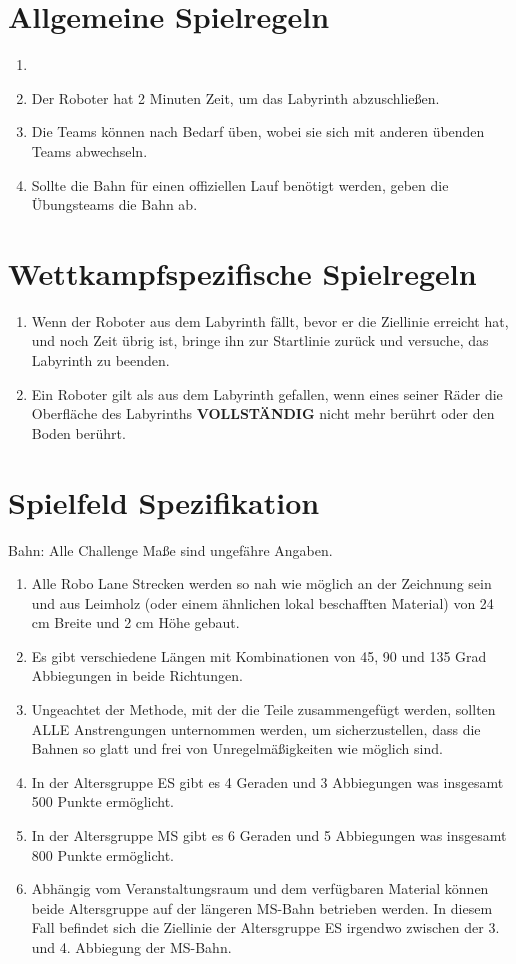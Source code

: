 \documentclass[a4paper,12pt]{article}
\begin{document}
\section{Allgemeine Spielregeln}
\begin{enumerate}
	\item \scoreRuns
	\item Der Roboter hat 2 Minuten Zeit, um das Labyrinth abzuschließen.
	\item Die Teams können nach Bedarf üben, wobei sie sich mit anderen
		übenden Teams abwechseln.
	\item Sollte die Bahn für einen offiziellen Lauf benötigt werden, geben
		die Übungsteams die Bahn ab.
\end{enumerate}

\section{Wettkampfspezifische Spielregeln}
\begin{enumerate}
	\item Wenn der Roboter aus dem Labyrinth fällt, bevor er die Ziellinie
		erreicht hat, und noch Zeit übrig ist, bringe ihn zur
		Startlinie zurück und versuche, das Labyrinth zu beenden.
	\item Ein Roboter gilt als aus dem Labyrinth gefallen, wenn eines
		seiner Räder die Oberfläche des Labyrinths \textbf{VOLLSTÄNDIG}
		nicht mehr berührt oder den Boden berührt.
\end{enumerate}

\section{Spielfeld Spezifikation}

Bahn: Alle Challenge Maße sind ungefähre Angaben.
\begin{enumerate}
	\item Alle Robo Lane Strecken werden so nah wie möglich an der
		Zeichnung sein und aus Leimholz (oder einem ähnlichen lokal
		beschafften Material) von 24 cm Breite und 2 cm Höhe gebaut.
	\item Es gibt verschiedene Längen mit Kombinationen von 45, 90 und 135
		Grad Abbiegungen in beide Richtungen.
	\item Ungeachtet der Methode, mit der die Teile zusammengefügt werden,
		sollten ALLE Anstrengungen unternommen werden, um
		sicherzustellen, dass die Bahnen so glatt und frei von
		Unregelmäßigkeiten wie möglich sind.
	\item In der Altersgruppe ES gibt es 4 Geraden und 3 Abbiegungen was
		insgesamt 500 Punkte ermöglicht.
	\item In der Altersgruppe MS gibt es 6 Geraden und 5 Abbiegungen was
		insgesamt 800 Punkte ermöglicht.
	\item Abhängig vom Veranstaltungsraum und dem verfügbaren Material
		können beide Altersgruppe auf der längeren MS-Bahn betrieben
		werden. In diesem Fall befindet sich die Ziellinie der
		Altersgruppe ES irgendwo zwischen der 3. und 4. Abbiegung der
		MS-Bahn.
\end{enumerate}
\end{document}
